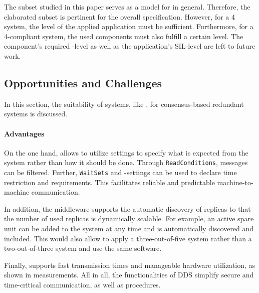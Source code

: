 The  subset studied in this paper serves as a model for  in general.
Therefore, the elaborated  subset is pertinent for the overall  specification.
However, for a  4 system, the  level of the applied  application must be sufficient. Furthermore, for a  4-compliant system, the used components must also fulfill a certain  level.
The component's required -level as well as the  application's SIL-level are left to future work.

\subsection{Opportunities and Challenges}

In this section, the suitability of  systems, like , for consensus-based redundant systems is discussed.

\paragraph{Advantages}
On the one hand,  allows to utilize  settings to specify what is expected from the system rather than how it should be done.
Through \texttt{ReadConditions}, messages can be filtered.
Further, \texttt{WaitSets} and -settings can be used to declare time restriction and requirements.
This facilitates reliable and predictable machine-to-machine communication.

In addition, the middleware supports the automatic discovery of replicas to that the number of used replicas is dynamically scalable.
For example, an active spare unit can be added to the system at any time and is automatically discovered and included.
This would also allow to apply a three-out-of-five system rather than a two-out-of-three system and use the same software.

Finally,  supports fast transmission times and manageable hardware utilization, as shown in measurements.
All in all, the functionalities of DDS simplify secure and time-critical communication, as well as procedures.

